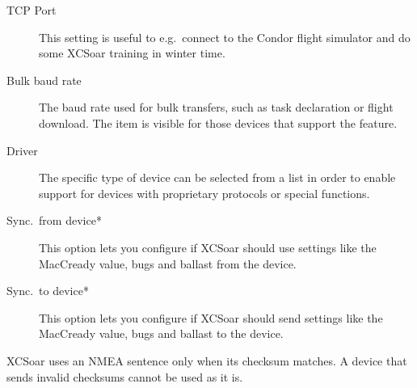 \begin{description}
\item[TCP Port]  This setting is useful to e.g.\ connect to the Condor flight
  simulator and do some XCSoar training in winter time.
\item[Bulk baud rate]  The baud rate used for bulk transfers, such 
  as task declaration or flight download. The item is visible for those 
  devices that support the feature.
\item[Driver]  The specific type of device can be selected from a list in order
  to enable support for devices with proprietary protocols or special
  functions.
\item[Sync.\ from device*]  This option lets you configure if XCSoar should use settings
  like the MacCready value, bugs and ballast from the device.
\item[Sync.\ to device*]  This option lets you configure if XCSoar should send settings
  like the MacCready value, bugs and ballast to the device.
\end{description}

XCSoar uses an NMEA sentence only when its checksum matches.  A device
that sends invalid checksums cannot be used as it is.
